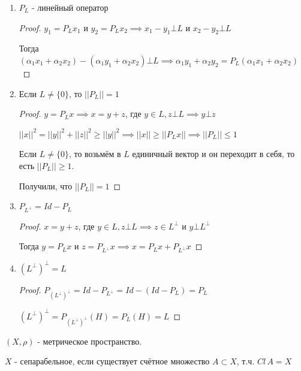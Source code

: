 \begin{properties}
    \begin{enumerate}
        \item { $P_L$ - линейный оператор
            \begin{proof}
                $y_1 = P_L x_1$ и $y_2 = P_L x_2 \implies x_1 - y_1 \bot L$ и $x_2 - y_2 \bot L$

                Тогда $(\alpha_1 x_1 + \alpha_2 x_2) - (\alpha_1 y_1 + \alpha_2 x_2) \bot L \implies \alpha_1 y_1 + \alpha_2 y_2 = P_L (\alpha_1 x_1 + \alpha_2 x_2)$
            \end{proof}
        }
        \item {
            Если $L \neq \{ 0 \}$, то $||P_L|| = 1$

            \begin{proof}
                $y = P_L x \implies x = y + z$, где $y \in L, z \bot L \implies y \bot z$

                $||x||^2 = ||y||^2 + ||z||^2 \geqslant ||y||^2 \implies ||x|| \geqslant ||P_L x|| \implies ||P_L|| \leqslant 1$

                Если $L \neq \{ 0 \}$, то возьмём в $L$ единичный вектор и он переходит в себя, то есть $|| P_L || \geq 1$.

                Получили, что $|| P_L || = 1$
            \end{proof}
        }
        \item {
            $P_{L^\bot} = Id - P_L$

            \begin{proof}
                $x = y + z$, где $y \in L, z \bot L \implies z \in L^\bot$ и $y \bot L^\bot$

                Тогда $y = P_L x$ и $z = P_{L^\bot} x \implies x = P_{L} x + P_{L^\bot} x$
            \end{proof}
        }
        \item {
            $(L^\bot)^\bot = L$  

            \begin{proof}
                $P_{(L^\bot)^\bot} = Id - P_{L^\bot} = Id - (Id - P_L) = P_L$

                $(L^\bot)^\bot = P_{(L^\bot)^\bot} (H) = P_L (H) = L$
            \end{proof}
        }
    \end{enumerate}
\end{properties}

\begin{definition}
    $(X, \rho)$ - метрическое пространство.

    $X$ - сепарабельное, если существует счётное множество $A \subset X$, т.ч. $Cl \, A = X$
\end{definition}

